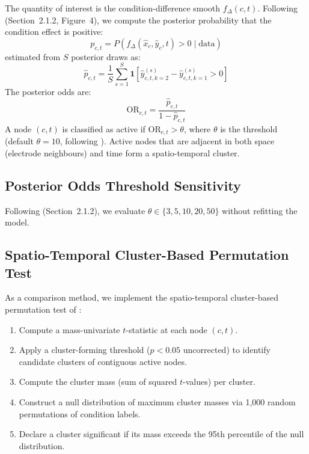 \documentclass[12pt, a4paper]{article}
\begin{document}
The quantity of interest is the condition-difference smooth
$f_\Delta(c,t)$.
Following \citet{Nalborczyk2025} (Section~2.1.2, Figure~4), we compute
the posterior probability that the condition effect is positive:
%
\begin{equation}\label{eq:prob}
  p_{c,t} = P\!\left(f_\Delta(\hat{x}_c, \hat{y}_c, t) > 0 \mid \text{data}\right)
\end{equation}
%
estimated from $S$ posterior draws as:
%
\begin{equation}\label{eq:prob_est}
  \hat{p}_{c,t} = \frac{1}{S}\sum_{s=1}^{S}
    \mathbf{1}\!\left[\hat{y}^{(s)}_{c,t,k=2} - \hat{y}^{(s)}_{c,t,k=1} > 0\right]
\end{equation}
%
The posterior odds are:
%
\begin{equation}\label{eq:odds}
  \mathrm{OR}_{c,t} = \frac{\hat{p}_{c,t}}{1 - \hat{p}_{c,t}}
\end{equation}
%
A node $(c,t)$ is classified as active if $\mathrm{OR}_{c,t} > \theta$,
where $\theta$ is the threshold (default $\theta = 10$, following
\citealt{Nalborczyk2025}).
Active nodes that are adjacent in both space (electrode neighbours) and
time form a spatio-temporal cluster.

\subsection{Posterior Odds Threshold Sensitivity}

Following \citet{Nalborczyk2025} (Section~2.1.2), we evaluate
$\theta \in \{3, 5, 10, 20, 50\}$ without refitting the model.

\subsection{Spatio-Temporal Cluster-Based Permutation Test}

As a comparison method, we implement the spatio-temporal cluster-based
permutation test of \citet{Maris2007,Pernet2015}:
%
\begin{enumerate}[label=\arabic*.]
  \item Compute a mass-univariate $t$-statistic at each node $(c,t)$.
  \item Apply a cluster-forming threshold ($p < 0.05$ uncorrected) to
        identify candidate clusters of contiguous active nodes.
  \item Compute the cluster mass (sum of squared $t$-values) per cluster.
  \item Construct a null distribution of maximum cluster masses via
        1{,}000 random permutations of condition labels.
  \item Declare a cluster significant if its mass exceeds the 95th percentile
        of the null distribution.
\end{enumerate}
\end{document}
